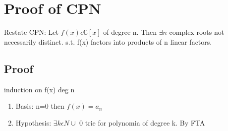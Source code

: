 \documentclass{article}
\begin{document}
\section{Proof of CPN}
Restate CPN:
Let $f(x)\epsilon \mathbb{C}[x]$ of degree n. Then $\exists n$ complex roots not necessarily distinct.  s.t. f(x) factors into products of n linear factors. 
\subsection{Proof}
induction on f(x) deg n
\\
\begin{enumerate}
\item Basis: n=0 then $f(x)=a_n$
\item Hypothesis: $\exists k \epsilon N \cup$ {0} trie for polynomia of degree k.
By FTA
\end{enumerate}
\end{document}

